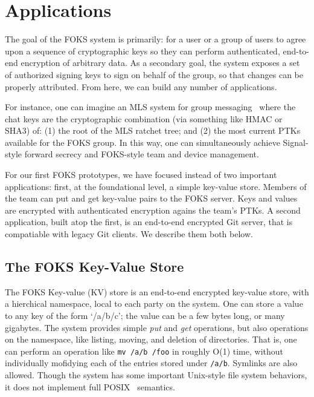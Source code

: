 
\section{Applications}

The goal of the FOKS system is primarily: for a user or a group of users to
agree upon a sequence of cryptographic keys so they can perform authenticated,
end-to-end encryption of arbitrary data. As a secondary goal, the system
exposes a set of authorized signing keys to sign on behalf of the group,
so that changes can be properly attributed. From here, we can build
any number of applications. 

For instance, one can imagine an MLS system for group messaging~\cite{MLS} where
the chat keys are the cryptographic combination (via something like HMAC or
SHA3) of: (1) the root of the MLS ratchet tree; and (2) the most current PTKs
available for the FOKS group. In this way, one can simultaneously achieve
Signal-style forward secrecy and FOKS-style team and device management. 

For our first FOKS prototypes, we have focused instead of two important applications:
first, at the foundational level, a simple key-value store. Members of the team
can put and get key-value pairs to the FOKS server. Keys and values are encrypted
with authenticated encryption agains the team's PTKs. A second application, built
atop the first, is an end-to-end encrypted Git server, that is compatiable with
legacy Git clients. We describe them both below.

\subsection{The FOKS Key-Value Store}

The FOKS Key-value (KV) store is an end-to-end encrypted key-value store, with 
a hierchical namespace, local to each party on the system. One can store a value
to any key of the form `/a/b/c'; the value can be a few bytes long, or many gigabytes.
The system provides simple \textit{put} and \textit{get} operations, but also
operations on the namespace, like listing, moving, and deletion of directories. That is,
one can perform an operation like \texttt{mv /a/b /foo} in roughly O(1) time, without
individually mofidying each of the entries stored under \texttt{/a/b}. Symlinks are also 
allowed. Though the system has some important Unix-style file system behaviors,
it does not implement full POSIX~\cite{posix-2017} semantics.

